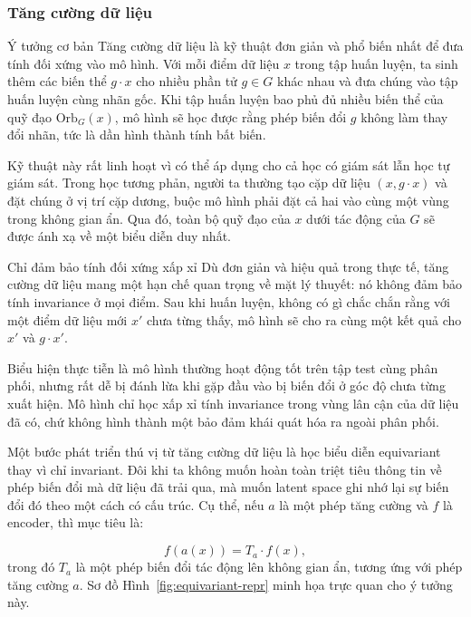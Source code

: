 \subsubsection{Tăng cường dữ liệu}
\label{subsubsec:data-augmentation}

\begin{infobox}{Ý tưởng cơ bản}
Tăng cường dữ liệu là kỹ thuật đơn giản và phổ biến nhất để đưa tính đối xứng vào mô hình. Với mỗi điểm dữ liệu $x$ trong tập huấn luyện, ta sinh thêm các biến thể $g \cdot x$ cho nhiều phần tử $g \in G$ khác nhau và đưa chúng vào tập huấn luyện cùng nhãn gốc. Khi tập huấn luyện bao phủ đủ nhiều biến thể của quỹ đạo $\mathrm{Orb}_G(x)$, mô hình sẽ học được rằng phép biến đổi $g$ không làm thay đổi nhãn, tức là dần hình thành tính bất biến.
\end{infobox}

Kỹ thuật này rất linh hoạt vì có thể áp dụng cho cả học có giám sát lẫn học tự giám sát. Trong học tương phản, người ta thường tạo cặp dữ liệu $(x, g \cdot x)$ và đặt chúng ở vị trí cặp dương, buộc mô hình phải đặt cả hai vào cùng một vùng trong không gian ẩn. Qua đó, toàn bộ quỹ đạo của $x$ dưới tác động của $G$ sẽ được ánh xạ về một biểu diễn duy nhất.

\begin{warningbox}{Chỉ đảm bảo tính đối xứng xấp xỉ}
Dù đơn giản và hiệu quả trong thực tế, tăng cường dữ liệu mang một hạn chế quan trọng về mặt lý thuyết: nó không đảm bảo tính invariance ở mọi điểm. Sau khi huấn luyện, không có gì chắc chắn rằng với một điểm dữ liệu mới $x'$ chưa từng thấy, mô hình sẽ cho ra cùng một kết quả cho $x'$ và $g \cdot x'$. 

Biểu hiện thực tiễn là mô hình thường hoạt động tốt trên tập test cùng phân phối, nhưng rất dễ bị đánh lừa khi gặp đầu vào bị biến đổi ở góc độ chưa từng xuất hiện. Mô hình chỉ học xấp xỉ tính invariance trong vùng lân cận của dữ liệu đã có, chứ không hình thành một bảo đảm khái quát hóa ra ngoài phân phối.
\end{warningbox}

\begin{morong}
Một bước phát triển thú vị từ tăng cường dữ liệu là học biểu diễn equivariant thay vì chỉ invariant. Đôi khi ta không muốn hoàn toàn triệt tiêu thông tin về phép biến đổi mà dữ liệu đã trải qua, mà muốn latent space ghi nhớ lại sự biến đổi đó theo một cách có cấu trúc. Cụ thể, nếu $a$ là một phép tăng cường và $f$ là encoder, thì mục tiêu là:

\begin{equation}
    f(a(x)) = T_a \cdot f(x),
\end{equation}
trong đó $T_a$ là một phép biến đổi tác động lên không gian ẩn, tương ứng với phép tăng cường $a$. Sơ đồ Hình~\ref{fig:equivariant-repr} minh họa trực quan cho ý tưởng này.
\end{morong}

